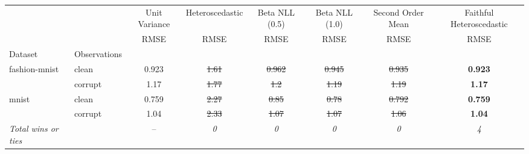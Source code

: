 \begin{tabular}{ll|c|c|c|c|c|c}
\toprule
{} & {} & {Unit Variance} & {Heteroscedastic} & {Beta NLL (0.5)} & {Beta NLL (1.0)} & {Second Order Mean} & {Faithful Heteroscedastic} \\
{} & {} & {RMSE} & {RMSE} & {RMSE} & {RMSE} & {RMSE} & {RMSE} \\
{Dataset} & {Observations} & {} & {} & {} & {} & {} & {} \\
\midrule
\multirow[t]{2}{*}{fashion-mnist} & clean & 0.923 & \sout{1.61} & \sout{0.962} & \sout{0.945} & \sout{0.935} & \textbf{0.923} \\
 & corrupt & 1.17 & \sout{1.77} & \sout{1.2} & \sout{1.19} & \sout{1.19} & \textbf{1.17} \\
\multirow[t]{2}{*}{mnist} & clean & 0.759 & \sout{2.27} & \sout{0.85} & \sout{0.78} & \sout{0.792} & \textbf{0.759} \\
 & corrupt & 1.04 & \sout{2.33} & \sout{1.07} & \sout{1.07} & \sout{1.06} & \textbf{1.04} \\
\textit{{Total wins or ties}} &  & -- & \textit{0} & \textit{0} & \textit{0} & \textit{0} & \textit{4} \\
\bottomrule
\end{tabular}
